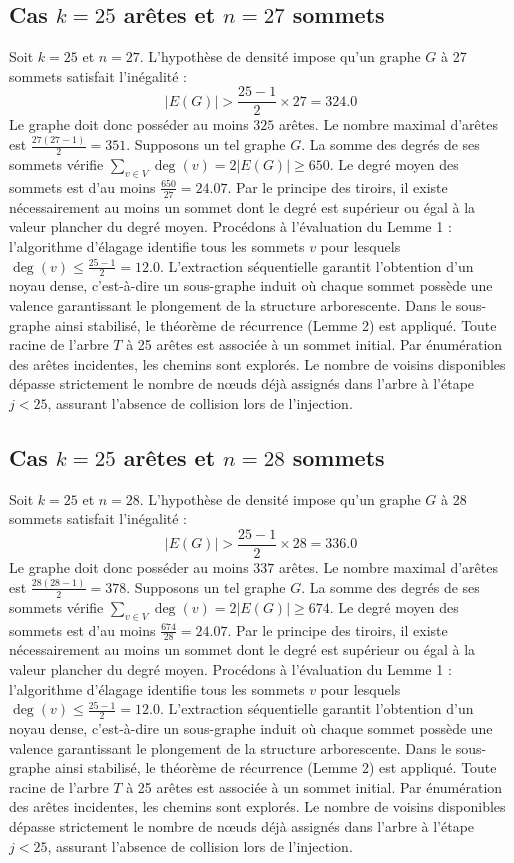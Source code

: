 \documentclass[12pt,a4paper]{article}
\begin{document}
\subsection{Cas $k = 25$ arêtes et $n = 27$ sommets}
Soit $k = 25$ et $n = 27$. L'hypothèse de densité impose qu'un graphe $G$ à 27 sommets satisfait l'inégalité :
$$ |E(G)| > \frac{25-1}{2} \times 27 = 324.0 $$
Le graphe doit donc posséder au moins $325$ arêtes. Le nombre maximal d'arêtes est $\frac{27(27-1)}{2} = 351$.
Supposons un tel graphe $G$. La somme des degrés de ses sommets vérifie $\sum_{v \in V} \deg(v) = 2|E(G)| \geq 650$.
Le degré moyen des sommets est d'au moins $\frac{650}{27} = 24.07$.
Par le principe des tiroirs, il existe nécessairement au moins un sommet dont le degré est supérieur ou égal à la valeur plancher du degré moyen.
Procédons à l'évaluation du Lemme 1 : l'algorithme d'élagage identifie tous les sommets $v$ pour lesquels $\deg(v) \leq \frac{25-1}{2} = 12.0$.
L'extraction séquentielle garantit l'obtention d'un noyau dense, c'est-à-dire un sous-graphe induit où chaque sommet possède une valence garantissant le plongement de la structure arborescente.
Dans le sous-graphe ainsi stabilisé, le théorème de récurrence (Lemme 2) est appliqué. Toute racine de l'arbre $T$ à 25 arêtes est associée à un sommet initial. Par énumération des arêtes incidentes, les chemins sont explorés. Le nombre de voisins disponibles dépasse strictement le nombre de nœuds déjà assignés dans l'arbre à l'étape $j < 25$, assurant l'absence de collision lors de l'injection.

\subsection{Cas $k = 25$ arêtes et $n = 28$ sommets}
Soit $k = 25$ et $n = 28$. L'hypothèse de densité impose qu'un graphe $G$ à 28 sommets satisfait l'inégalité :
$$ |E(G)| > \frac{25-1}{2} \times 28 = 336.0 $$
Le graphe doit donc posséder au moins $337$ arêtes. Le nombre maximal d'arêtes est $\frac{28(28-1)}{2} = 378$.
Supposons un tel graphe $G$. La somme des degrés de ses sommets vérifie $\sum_{v \in V} \deg(v) = 2|E(G)| \geq 674$.
Le degré moyen des sommets est d'au moins $\frac{674}{28} = 24.07$.
Par le principe des tiroirs, il existe nécessairement au moins un sommet dont le degré est supérieur ou égal à la valeur plancher du degré moyen.
Procédons à l'évaluation du Lemme 1 : l'algorithme d'élagage identifie tous les sommets $v$ pour lesquels $\deg(v) \leq \frac{25-1}{2} = 12.0$.
L'extraction séquentielle garantit l'obtention d'un noyau dense, c'est-à-dire un sous-graphe induit où chaque sommet possède une valence garantissant le plongement de la structure arborescente.
Dans le sous-graphe ainsi stabilisé, le théorème de récurrence (Lemme 2) est appliqué. Toute racine de l'arbre $T$ à 25 arêtes est associée à un sommet initial. Par énumération des arêtes incidentes, les chemins sont explorés. Le nombre de voisins disponibles dépasse strictement le nombre de nœuds déjà assignés dans l'arbre à l'étape $j < 25$, assurant l'absence de collision lors de l'injection.
\end{document}
